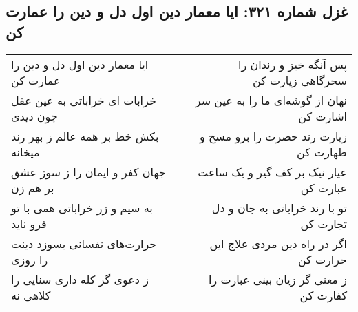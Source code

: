 \begin{center}
\section*{غزل شماره ۳۲۱: ایا معمار دین اول دل و دین را عمارت کن}
\label{sec:321}
\begin{longtable}{l p{0.5cm} r}
ایا معمار دین اول دل و دین را عمارت کن
&&
پس آنگه خیز و رندان را سحرگاهی زیارت کن
\\
خرابات ای خراباتی به عین عقل چون دیدی
&&
نهان از گوشه‌ای ما را به عین سر اشارت کن
\\
بکش خط بر همه عالم ز بهر رند میخانه
&&
زیارت رند حضرت را برو مسح و طهارت کن
\\
جهان کفر و ایمان را ز سوز عشق بر هم زن
&&
عیار نیک بر کف گیر و یک ساعت عبارت کن
\\
به سیم و زر خراباتی همی با تو فرو ناید
&&
تو با رند خراباتی به جان و دل تجارت کن
\\
حرارت‌های نفسانی بسوزد دینت را روزی
&&
اگر در راه دین مردی علاج این حرارت کن
\\
ز دعوی گر کله داری سنایی را کلاهی نه
&&
ز معنی گر زیان بینی عبارت را کفارت کن
\\
\end{longtable}
\end{center}
